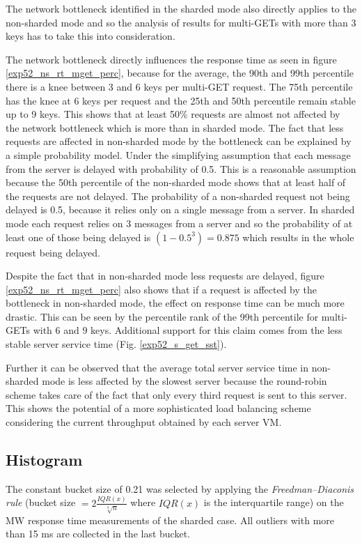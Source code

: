 \documentclass[report.tex]{subfiles}
\begin{document}
The network bottleneck identified in the sharded mode also directly applies to the non-sharded mode and so the analysis of results for multi-GETs with more than 3 keys has to take this into consideration.

The network bottleneck directly influences the response time as seen in figure \ref{exp52_ns_rt_mget_perc}, because for the average, the 90th and 99th percentile there is a knee between 3 and 6 keys per multi-GET request. The 75th percentile has the knee at 6 keys per request and the 25th and 50th percentile remain stable up to 9 keys. This shows that at least 50\% requests are almost not affected by the network bottleneck which is more than in sharded mode. The fact that less requests are affected in non-sharded mode by the bottleneck can be explained by a simple probability model.
Under the simplifying assumption that each message from the server is delayed with probability of 0.5. This is a reasonable assumption because the 50th percentile of the non-sharded mode shows that at least half of the requests are not delayed.
The probability of a non-sharded request not being delayed is 0.5, because it relies only on a single message from a server.
In sharded mode each request relies on 3 messages from a server and so the probability of at least one of those being delayed is $(1-0.5^3)=0.875$ which results in the whole request being delayed.

Despite the fact that in non-sharded mode less requests are delayed, figure \ref{exp52_ns_rt_mget_perc} also shows that if a request is affected by the bottleneck in non-sharded mode, the effect on response time can be much more drastic. This can be seen by the percentile rank of the 99th percentile for multi-GETs with 6 and 9 keys. Additional support for this claim comes from the less stable server service time (Fig. \ref{exp52_s_get_sst}).

Further it can be observed that the average total server service time in non-sharded mode is less affected by the slowest server because the round-robin scheme takes care of the fact that only every third request is sent to this server. This shows the potential of a more sophisticated load balancing scheme considering the current throughput obtained by each server VM.


\subsection{Histogram}


The constant bucket size of 0.21 was selected by applying the \emph{Freedman–Diaconis rule} (bucket size $ = 2 \frac{IQR(x)}{\sqrt[3]{n}}$ where $IQR(x)$ is the interquartile range) on the MW response time measurements of the sharded case. All outliers with more than 15 ms are collected in the last bucket.
\end{document}
